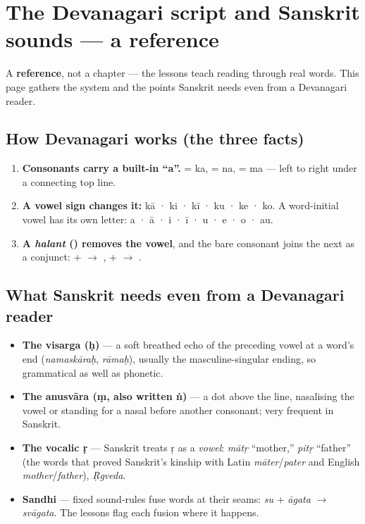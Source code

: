 
\chapter*{The Devanagari script and Sanskrit sounds --- a reference}

A \textbf{reference}, not a chapter — the lessons teach reading through real words. This page gathers the system and the points Sanskrit needs even from a Devanagari reader.

\section*{How Devanagari works (the three facts)}

\begin{enumerate}
\raggedright
\setlength{\itemsep}{0.35em}
  \item \textbf{Consonants carry a built-in \textquotedblleft{}a\textquotedblright{}.}  = ka,  = na,  = ma — left to right under a connecting top line.
  \item \textbf{A vowel sign changes it:}  kā ·  ki ·  kī ·  ku ·  ke ·  ko. A word-initial vowel has its own letter:  a ·  ā ·  i ·  ī ·  u ·  e ·  o ·  au.
  \item \textbf{A \emph{halant} () removes the vowel}, and the bare consonant joins the next as a conjunct:  +  $\to$ ,  +  $\to$ .
\end{enumerate}

\section*{What Sanskrit needs even from a Devanagari reader}

\begin{itemize}
\raggedright
\setlength{\itemsep}{0.35em}
  \item \textbf{The visarga  (ḥ)} — a soft breathed echo of the preceding vowel at a word's end (\emph{namaskāraḥ}, \emph{rāmaḥ}), usually the masculine-singular ending, so grammatical as well as phonetic.
  \item \textbf{The anusvāra  (ṃ, also written ṅ)} — a dot above the line, nasalising the vowel or standing for a nasal before another consonant; very frequent in Sanskrit.
  \item \textbf{The vocalic ṛ } — Sanskrit treats ṛ as a \emph{vowel}: \emph{mātṛ} \textquotedblleft{}mother,\textquotedblright{} \emph{pitṛ} \textquotedblleft{}father\textquotedblright{} (the words that proved Sanskrit's kinship with Latin \emph{māter}/\emph{pater} and English \emph{mother}/\emph{father}), \emph{Ṛgveda}.
  \item \textbf{Sandhi} — fixed sound-rules fuse words at their seams: \emph{su} + \emph{āgata} $\to$ \emph{svāgata}. The lessons flag each fusion where it happens.
\end{itemize}

